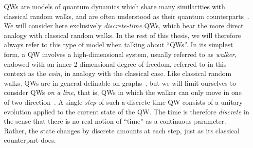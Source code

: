 \acp{QW} are models of quantum dynamics which share many similarities with classical random walks, and are often understood as their quantum counterparts~\cite{aharonov2000quantum,kempe2003quantum,venegasandraca2012quantum,portugal2013quantum}.
We will consider here exclusively \emph{discrete-time} \acp{QW}, which bear the more direct analogy with classical random walks. In the rest of this thesis, we will therefore always refer to this type of model when talking about ``QWs''.
In its simplest form, a \ac{QW} involves a high-dimensional system, usually referred to as \emph{walker}, endowed with an inner $2$-dimensional degree of freedom, referred to in this context as the \emph{coin}, in analogy with the classical case.
Like classical random walks, QWs are in general definable on graphs~\cite{aharonov2000quantum}, but we will limit ourselves to consider QWs \emph{on a line}, that is, QWs in which the walker can only move in one of two direction~\cite{ambainis2001onedimensional}.
A single \textit{step} of such a discrete-time \ac{QW} consists of a unitary evolution applied to the current state of the \ac{QW}. The time is therefore \emph{discrete} in the sense that there is no real notion of ``time'' as a continuous parameter. Rather, the state changes by discrete amounts at each step, just as its classical counterpart does.


